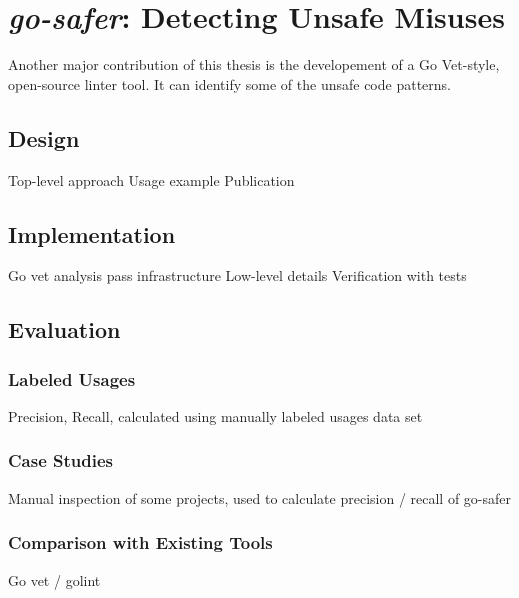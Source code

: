 \chapter{\textit{go-safer}: Detecting Unsafe Misuses}\label{ch:go-safer}

Another major contribution of this thesis is the developement of a Go Vet-style, open-source linter tool. It can
identify some of the unsafe code patterns.




\section{Design}

Top-level approach
Usage example
Publication




\section{Implementation}

Go vet analysis pass infrastructure
Low-level details
Verification with tests


\section{Evaluation}

\subsection{Labeled Usages}

Precision, Recall, calculated using manually labeled usages data set


\subsection{Case Studies}

Manual inspection of some projects, used to calculate precision / recall of go-safer


\subsection{Comparison with Existing Tools}

Go vet / golint
